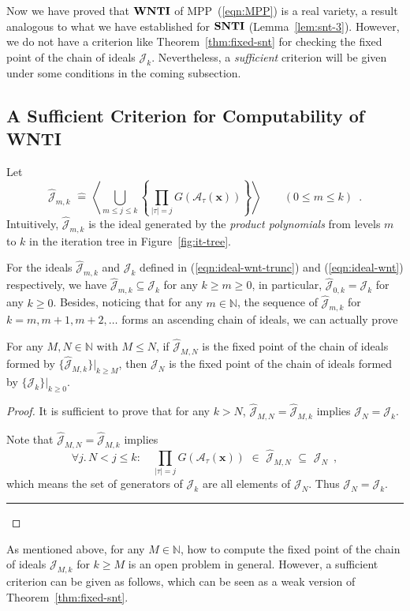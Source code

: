 \documentclass{jssc}
\newcommand{\rulex}{\hfill\rule{1mm}{3mm}}
\newcommand{\A}{\mathcal{A}}
\newcommand{\J}{\mathcal{J}}
\newcommand{\define}{\hat{=}}
\newcommand{\xx}{\mathbf{x}}
\newcommand{\SNTI}{{\bf SNTI}}
\newcommand{\WNTI}{{\bf WNTI}}
\begin{document}
Now we have proved that $\WNTI$ of MPP~(\ref{eqn:MPP}) is a real variety, a result analogous to what we have established for $\SNTI$ (Lemma~\ref{lem:snt-3}). However, we do not have a criterion like Theorem~\ref{thm:fixed-snt} for checking the fixed point of the chain of ideals $\J_k$. Nevertheless, a \emph{sufficient} criterion will be given under some conditions in the coming subsection.

\subsection{A Sufficient Criterion for Computability of WNTI}
Let \begin{equation}\label{eqn:ideal-wnt-trunc}
\hat{\J}_{m,k}\,\,\define\,\left\langle \bigcup_{m \leq j \leq k}\left\{ \prod_{|\tau|=j} G(\A_{\tau}(\xx)) \right\} \right\rangle \qquad (0 \leq m \leq k) \enspace .
\end{equation}
Intuitively, $\hat{\J}_{m,k}$ is the ideal generated by the \emph{product polynomials} from levels $m$ to $k$ in the iteration tree in Figure~\ref{fig:it-tree}.

For the ideals $\hat{\J}_{m,k}$ and $\J_k$ defined in (\ref{eqn:ideal-wnt-trunc}) and (\ref{eqn:ideal-wnt}) respectively, we have $\hat{\J}_{m,k} \subseteq \J_k$ for any $k \geq m \geq 0$, in particular, $\hat{\J}_{0,k}=\J_k$ for any $k \geq 0$. Besides, noticing that for any $m \in \mathbb{N}$, the sequence of $\hat{\J}_{m,k}$ for $k=m,m+1,m+2,\ldots$ forms an ascending chain of ideals, we can actually prove
\begin{lemma}\label{lem:wnt-4}
For any $M,N \in \mathbb{N}$ with $M \leq N$, if $\hat{\J}_{M,N}$ is the fixed point of the chain of ideals formed by $\{\hat{\J}_{M,k}\}|_{k \geq M}$, then $\J_N$ is the fixed point of the chain of ideals formed by $\{\J_k\}|_{k \geq 0}$.
\end{lemma}
\begin{proof}
It is sufficient to prove that for any $k> N$, $\hat{\J}_{M,N}=\hat{\J}_{M,k}$ implies $\J_N=\J_k$.

Note that $\hat{\J}_{M,N}=\hat{\J}_{M,k}$ implies
\[
\forall j. \,N<j \leq k: \quad \prod_{|\tau|=j} G(\A_{\tau}(\xx))\,\,\in \,\,\hat{\J}_{M,N}\,\,\subseteq\,\, \J_N  \enspace ,
\]
which means the set of generators of $\J_k$ are all elements of $\J_N$. Thus $\J_N=\J_k$. \rulex
\end{proof}

As mentioned above, for any $M \in \mathbb{N}$, how to compute the fixed point of the chain of ideals $\J_{M,k}$ for $k \geq M$ is an open problem in general. However, a sufficient criterion can be given as follows, which can be seen as a weak version of Theorem~\ref{thm:fixed-snt}.
\end{document}
